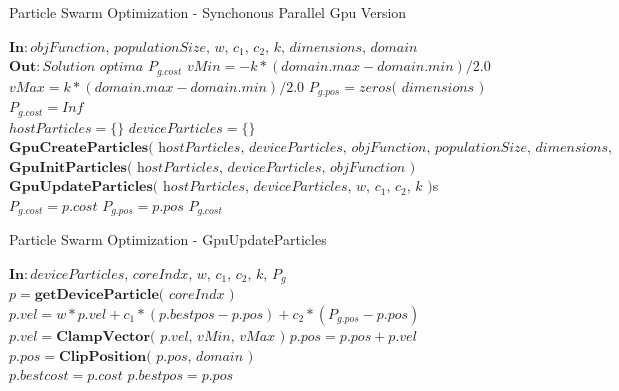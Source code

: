 \documentclass[journal]{IEEEtran}
\begin{document}
\begin{algorithm*}
    \caption{Particle Swarm Optimization - Synchonous Parallel Gpu Version}\label{alg:PSOgpu}
    \begin{algorithmic}[1]
        \State $\textbf{In}: \textit{objFunction, populationSize, w, $c_{1}$, $c_{2}$, k, dimensions, domain}$
        \State $\textbf{Out}: \textit{Solution optima } P_{g.cost}$
        \State $vMin = -k * ( domain.max - domain.min ) / 2.0$
        \State $vMax =  k * ( domain.max - domain.min ) / 2.0$
        \State $P_{g.pos} = \textit{zeros( dimensions )}$ 
        \State $P_{g.cost} = Inf$ 
        \\
        \State $hostParticles = \lbrace \rbrace$
        \State $deviceParticles = \lbrace \rbrace$
        \State $\textbf{GpuCreateParticles}\textit{( hostParticles, deviceParticles, objFunction, populationSize, dimensions, domain )}$
        \State $\textbf{GpuInitParticles}\textit{( hostParticles, deviceParticles, objFunction )}$
        \\
         
            \State $\textbf{GpuUpdateParticles}\textit{( hostParticles, deviceParticles, w, $c_{1}$, $c_{2}$, k )}$s
                    \State $P_{g.cost} = p.cost$ 
                    \State $P_{g.pos} = p.pos$
                \EndIf
            \EndFor
        \EndWhile
        \Return $P_{g.cost}$
    \end{algorithmic}
\end{algorithm*}

\begin{algorithm*}
    \caption{Particle Swarm Optimization - GpuUpdateParticles}\label{alg:PSOgpu_kernel_updateparticles}
    \begin{algorithmic}[1]
        \State $\textbf{In}: \textit{deviceParticles, coreIndx, w, $c_{1}$, $c_{2}$, k, $P_{g}$}$
        \State $p = \textbf{getDeviceParticle}\textit{( coreIndx )}$
        \State $p.vel = w * p.vel + 
                        c_{1} * ( p.bestpos - p.pos ) + 
                        c_{2} * ( P_{g.pos} - p.pos )$ 
        \State $p.vel = \textbf{ClampVector}\textit{( p.vel, vMin, vMax )}$
        \State $p.pos = p.pos + p.vel$ 
        \State $p.pos = \textbf{ClipPosition}\textit{( p.pos, domain )}$
        \\
            \State $p.bestcost = p.cost$ 
            \State $p.bestpos = p.pos$
        \EndIf
    \end{algorithmic}
\end{algorithm*}
\end{document}
